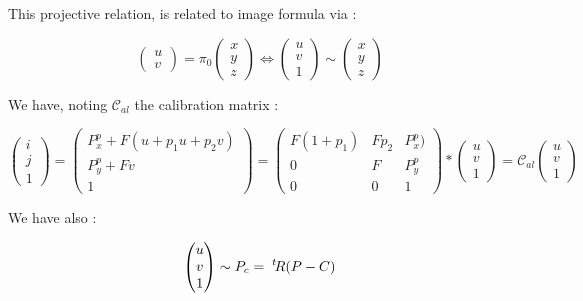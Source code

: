 This projective relation, is related to image formula via :

\begin{equation}
	 \begin{pmatrix} u \\ v \end{pmatrix}  = \pi_0  \begin{pmatrix} x \\ y \\z  \end{pmatrix}
   \Leftrightarrow   \begin{pmatrix} u \\ v \\ 1 \end{pmatrix}  \sim  \begin{pmatrix} x \\ y \\z  \end{pmatrix}
\end{equation}

We have, noting $\mathcal{C}_{al}$ the calibration matrix :

\begin{equation}
	   \begin{pmatrix} i \\ j \\ 1\end{pmatrix}
      =   \begin{pmatrix} P^p_x + F(u+p_1u+p_2v) \\ P^p_y + F v \\ 1\end{pmatrix}
      =  \begin{pmatrix} F(1+p_1) & F p_2 & P^p_x ) \\  0 &   F & P^p_y \\  0 & 0 &1\end{pmatrix} * \begin{pmatrix} u \\  v \\ 1\end{pmatrix} 
	      =  \mathcal{C}_{al} \begin{pmatrix} u \\  v \\ 1\end{pmatrix} 
              \label{UCResecCalibM}
\end{equation}

We have also :

\begin{equation}
	 \begin{pmatrix} u \\  v \\ 1\end{pmatrix}
		 \sim P_c =  \; ^{t} \! R(P-C)
\end{equation}

